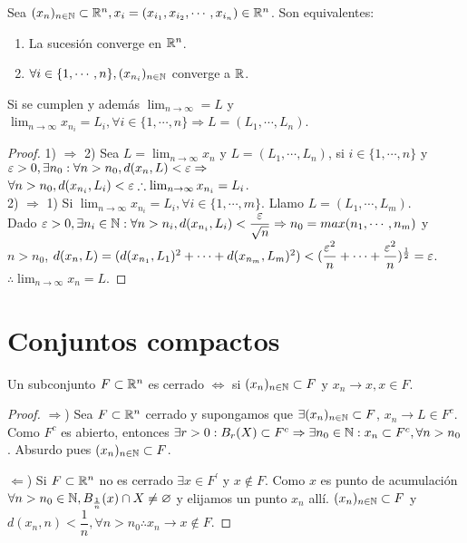 \begin{prop}
  Sea $(x_n)_{n \in \mathbb{N}} \subset \mathbb{R}^n, x_i = (x_{i_1}, x_{i_2}, \cdots, x_{i_n}) \in \mathbb{R}^n$. Son equivalentes:
  \begin{enumerate}
    \item La sucesión converge en $\mathbb{R}^n$.
    \item $\forall i \in \{1, \cdots, n\}, (x_{n_i})_{n \in \mathbb{N}}$ converge a $\mathbb{R}$.
  \end{enumerate}
  Si se cumplen y además $\lim_{n \to \infty} = L$ y $\lim_{n \to \infty} x_{n_i} = L_i, \forall i \in \{1, \cdots, n\} \Rightarrow L = (L_1, \cdots, L_n)$.
  \begin{proof}
    1) $\Rightarrow$ 2) Sea $L = \lim_{n \to \infty} x_n$ y $L = (L_1, \cdots, L_n)$, si $i \in \{1, \cdots, n\}$ y $\varepsilon > 0, \exists n_0 : \forall n > n_0, d(x_n, L) < \varepsilon \Rightarrow$ \\
    $\forall n > n_0, d(x_{n_i}, L_i) < \varepsilon \therefore \lim_{n \to \infty} x_{n_i} = L_i$. \\
    2) $\Rightarrow$ 1) Si $\lim_{n \to \infty} x_{n_i} = L_i, \forall i \in \{1, \cdots, m\}$. Llamo $L = (L_1, \cdots, L_m)$. \\
    Dado $\varepsilon > 0, \exists n_i \in \mathbb{N} : \forall n > n_i, d(x_{n_i}, L_i) < \dfrac{\varepsilon}{\sqrt{n}} \Rightarrow n_0 = max(n_1, \cdots, n_m)$ y $n > n_0$, $d(x_n, L) = (d(x_{n_1}, L_1)^2 + \cdots + d(x_{n_m}, L_m)^2) < (\dfrac{\varepsilon^2}{n} + \cdots + \dfrac{\varepsilon^2}{n})^{\frac{1}{2}} = \varepsilon$. \\
    $\therefore \lim_{n \to \infty} x_n = L$.
  \end{proof}
\end{prop}

\section{Conjuntos compactos}

\begin{theorem}
  Un subconjunto $F \subset \mathbb{R}^n$ es cerrado $\iff$ si $(x_n)_{n \in \mathbb{N}} \subset F$ y $x_n \to x, x \in F$.
  \begin{proof}
    $\Rightarrow$) Sea $F \subset \mathbb{R}^n$ cerrado y supongamos que $\exists (x_n)_{n \in \mathbb{N}} \subset F$, $x_n \to L \in F^c$. Como $F^c$ es abierto, entonces $\exists r > 0 : B_r(X) \subset F^c \Rightarrow \exists n_0 \in \mathbb{N} : x_n \subset F^c, \forall n > n_0$. Absurdo pues $(x_n)_{n \in \mathbb{N}} \subset F$.

    $\Leftarrow$) Si $F \subset \mathbb{R}^n$ no es cerrado $\exists x \in F^{\prime}$ y $x \notin F$. Como $x$ es punto de acumulación $\forall n > n_0 \in \mathbb{N}, B_{\frac{1}{n}}(x) \cap X \neq \varnothing$ y elijamos un punto $x_n$ allí. $(x_n)_{n \in \mathbb{N}} \subset F$ y $d(x_n, n) < \dfrac{1}{n}, \forall n > n_0 \therefore x_n \to x \notin F$.
  \end{proof}
\end{theorem}

